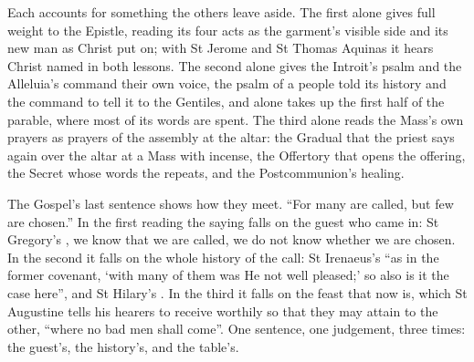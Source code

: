 Each accounts for something the others leave aside. The first alone gives full
weight to the Epistle, reading its four acts as the garment's visible side and
its new man as Christ put on; with St Jerome and St Thomas Aquinas it hears
Christ named in both lessons. The second alone gives the Introit's psalm and the
Alleluia's command their own voice, the psalm of a people told its history and
the command to tell it to the Gentiles, and alone takes up the first half of
the parable, where most of its words are spent. The third alone reads the Mass's
own prayers as prayers of the assembly at the altar: the Gradual that the priest
says again over the altar at a Mass with incense, the Offertory that opens the
offering, the Secret whose words the  repeats, and the
Postcommunion's healing.

The Gospel's last sentence shows how they meet. ``For many are called, but few
are chosen.'' In the first reading the saying falls on the guest who came in:
St Gregory's , we
know that we are called, we do not know whether we are chosen. In the second it
falls on the whole history of the call: St Irenaeus's ``as in the former
covenant, `with many of them was He not well pleased;' so also is it the case
here'', and St Hilary's . In the third it falls on the feast that now is, which St Augustine
tells his hearers to receive worthily so that they may attain to the other,
``where no bad men shall come''. One sentence, one judgement, three times: the
guest's, the history's, and the table's.
